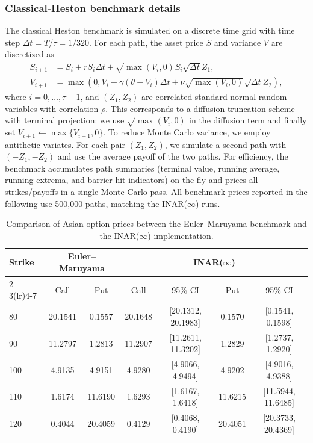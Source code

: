 \documentclass[letterpaper]{article}
\numberwithin{equation}{section}
\theoremstyle{definition}
\theoremstyle{remark}
\begin{document}
\subsubsection{Classical-Heston benchmark details}

The classical Heston benchmark is simulated on a discrete time grid with time step
$\Delta t = T/\tau = 1/320$. For each path, the asset price $S$ and variance $V$
are discretized as
\begin{align*}
    S_{i+1} &= S_i + r S_i \Delta t + \sqrt{\max(V_i, 0)} S_i \sqrt{\Delta t} Z_1, \\
    V_{i+1} &= \max\left(0, V_i + \gamma(\theta - V_i)\Delta t + \nu \sqrt{\max(V_i, 0)} \sqrt{\Delta t} Z_2\right),
\end{align*}
where $i=0, \dots, \tau-1$, and $(Z_1, Z_2)$ are correlated standard normal
random variables with correlation $\rho$. This corresponds to a diffusion-truncation
scheme with terminal projection: we use $\sqrt{\max(V_i,0)}$ in the diffusion
term and finally set $V_{i+1}\leftarrow \max\{V_{i+1},0\}$. To reduce Monte Carlo
variance, we employ antithetic variates. For each pair $(Z_1,Z_2)$, we simulate
a second path with $(-Z_1,-Z_2)$ and use the average payoff of the two paths.
For efficiency, the benchmark accumulates path summaries (terminal value,
running average, running extrema, and barrier-hit indicators) on the fly and
prices all strikes/payoffs in a single Monte Carlo pass. All benchmark prices
reported in the following use 500,000 paths, matching the INAR($\infty$) runs.

\begin{table}[ht]
  \centering
  \caption{Comparison of Asian option prices between the Euler--Maruyama benchmark and the INAR($\infty$) implementation.}
  \small
  \setlength{\tabcolsep}{5pt}
  \begin{tabular*}{\textwidth}{@{\extracolsep{\fill}}lcccccc@{}}
  \toprule
  \multirow{2}{*}{Strike} & \multicolumn{2}{c}{Euler--Maruyama} & \multicolumn{4}{c}{INAR($\infty$)} \\
  \cmidrule(lr){2-3}\cmidrule(lr){4-7}
   & Call & Put & Call & 95\% CI & Put & 95\% CI \\
  \midrule
  80  & 20.1541 & 0.1557 & 20.1648 & [20.1312, 20.1983] & 0.1570 & [0.1541, 0.1598] \\
  90  & 11.2797 & 1.2813 & 11.2907 & [11.2611, 11.3202] & 1.2829 & [1.2737, 1.2920] \\
  100 & 4.9135  & 4.9151  & 4.9280  & [4.9066, 4.9494]  & 4.9202  & [4.9016, 4.9388] \\
  110 & 1.6174  & 11.6190 & 1.6293  & [1.6167, 1.6418]  & 11.6215 & [11.5944, 11.6485] \\
  120 & 0.4044  & 20.4059 & 0.4129  & [0.4068, 0.4190]  & 20.4051 & [20.3733, 20.4369] \\
  \bottomrule
  \end{tabular*}
  \label{tab:asian_comparison}
\end{table}
\end{document}

